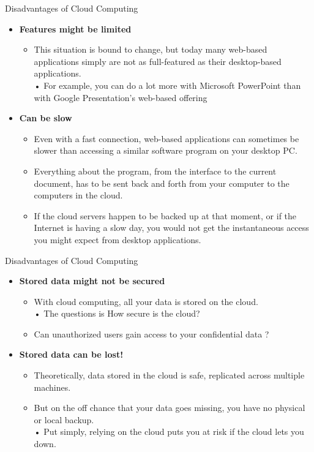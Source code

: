 \documentclass{SKP-beamer}
\begin{document}
\begin{frame}{Disadvantages of Cloud Computing}
	\begin{itemize}
		
		\item  \textbf{Features might be limited}
		\begin{itemize}
			\item  This situation is bound to change, but today many web-based applications simply 
			are not as full-featured as their desktop-based applications. \\
			• For example, you can do a lot more with Microsoft PowerPoint than with Google 
			Presentation's web-based offering
			
		\end{itemize}
		\item  \textbf{ Can be slow}
		\begin{itemize}
			\item Even with a fast connection, web-based applications can sometimes be slower than 
			accessing a similar software program on your desktop PC.
			\item  Everything about the program, from the interface to the current document, has to
			be sent back and forth from your computer to the computers in the cloud.
			\item  If the cloud servers happen to be backed up at that moment, or if the Internet is 
			having a slow day, you would not get the instantaneous access you might expect 
			from desktop applications.
			
		\end{itemize}
	\end{itemize}
\end{frame}


\begin{frame}{Disadvantages of Cloud Computing}
	\begin{itemize}
		
		\item  \textbf{Stored data might not be secured}
		\begin{itemize}
		\item  With cloud computing, all your data is stored on the cloud. \\
		• The questions is How secure is the cloud?
		\item  Can unauthorized users gain access to your confidential data ?
			
		\end{itemize}
		\item  \textbf{Stored data can be lost!}
		\begin{itemize}
			\item  Theoretically, data stored in the cloud is safe, replicated across multiple machines.
			\item  But on the off chance that your data goes missing, you have no physical or local backup. \\
			• Put simply, relying on the cloud puts you at risk if the cloud lets you down.
			
			
		\end{itemize}
	\end{itemize}
\end{frame}
\end{document}

